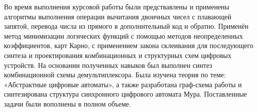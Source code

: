 
Во время выполнения курсовой работы были предствавлены и
применены алгоритмы выполнения операции вычитания двоичных чисел с
плавающей запятой, перевода числа из прямого в дополнительный код и обратно. Применён метод минимизации логических функций с помощью методов неопределенных коэффициентов, карт Карно, с применением закона склеивания для последующего синтеза и проектирования комбинационных и структурных схем цифровых устройств. На основании полученных навыков был выполнен синтез комбинационной схемы демультиплексора. Была изучена теория по теме: «Абстрактные цифровые автоматы», а также разработана граф-схема работы и синтезирована
структура синхронного цифрового автомата Мура. Поставленные задачи были вополнены в полном объеме.